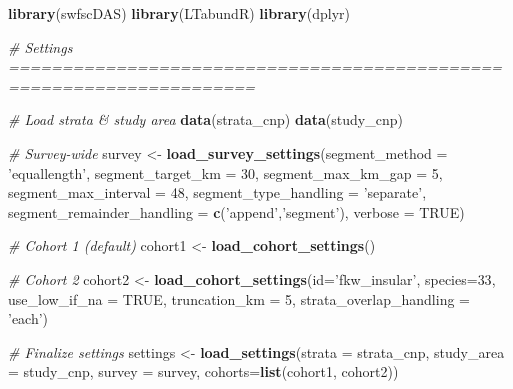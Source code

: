 \documentclass[
]{book}
\newenvironment{Shaded}{\begin{snugshade}}{\end{snugshade}}
\newcommand{\CommentTok}[1]{\textcolor[rgb]{0.56,0.35,0.01}{\textit{#1}}}
\newcommand{\DataTypeTok}[1]{\textcolor[rgb]{0.13,0.29,0.53}{#1}}
\newcommand{\DecValTok}[1]{\textcolor[rgb]{0.00,0.00,0.81}{#1}}
\newcommand{\KeywordTok}[1]{\textcolor[rgb]{0.13,0.29,0.53}{\textbf{#1}}}
\newcommand{\NormalTok}[1]{#1}
\newcommand{\OtherTok}[1]{\textcolor[rgb]{0.56,0.35,0.01}{#1}}
\newcommand{\StringTok}[1]{\textcolor[rgb]{0.31,0.60,0.02}{#1}}
\begin{document}
\begin{Shaded}
\begin{Highlighting}[]
\KeywordTok{library}\NormalTok{(swfscDAS)}
\KeywordTok{library}\NormalTok{(LTabundR)}
\KeywordTok{library}\NormalTok{(dplyr)}

\CommentTok{# Settings =====================================================================}

\CommentTok{# Load strata & study area}
\KeywordTok{data}\NormalTok{(strata_cnp)}
\KeywordTok{data}\NormalTok{(study_cnp)}

\CommentTok{# Survey-wide}
\NormalTok{survey <-}\StringTok{ }
\StringTok{  }\KeywordTok{load_survey_settings}\NormalTok{(}\DataTypeTok{segment_method =} \StringTok{'equallength'}\NormalTok{,}
                       \DataTypeTok{segment_target_km =} \DecValTok{30}\NormalTok{,}
                       \DataTypeTok{segment_max_km_gap =} \DecValTok{5}\NormalTok{,}
                       \DataTypeTok{segment_max_interval =} \DecValTok{48}\NormalTok{,}
                       \DataTypeTok{segment_type_handling =} \StringTok{'separate'}\NormalTok{,}
                       \DataTypeTok{segment_remainder_handling =} \KeywordTok{c}\NormalTok{(}\StringTok{'append'}\NormalTok{,}\StringTok{'segment'}\NormalTok{),}
                       \DataTypeTok{verbose =} \OtherTok{TRUE}\NormalTok{)}

\CommentTok{# Cohort 1 (default)}
\NormalTok{cohort1 <-}\StringTok{ }\KeywordTok{load_cohort_settings}\NormalTok{()}

\CommentTok{# Cohort 2}
\NormalTok{cohort2 <-}\StringTok{ }
\StringTok{  }\KeywordTok{load_cohort_settings}\NormalTok{(}\DataTypeTok{id=}\StringTok{'fkw_insular'}\NormalTok{,}
                       \DataTypeTok{species=}\DecValTok{33}\NormalTok{,}
                       \DataTypeTok{use_low_if_na =} \OtherTok{TRUE}\NormalTok{,}
                       \DataTypeTok{truncation_km =} \DecValTok{5}\NormalTok{,}
                       \DataTypeTok{strata_overlap_handling =} \StringTok{'each'}\NormalTok{)}

\CommentTok{# Finalize settings}
\NormalTok{settings <-}\StringTok{ }\KeywordTok{load_settings}\NormalTok{(}\DataTypeTok{strata =}\NormalTok{ strata_cnp,}
                          \DataTypeTok{study_area =}\NormalTok{ study_cnp,}
                          \DataTypeTok{survey =}\NormalTok{ survey,}
                          \DataTypeTok{cohorts=}\KeywordTok{list}\NormalTok{(cohort1,}
\NormalTok{                                       cohort2))}



\end{Highlighting}
\end{Shaded}
\end{document}
